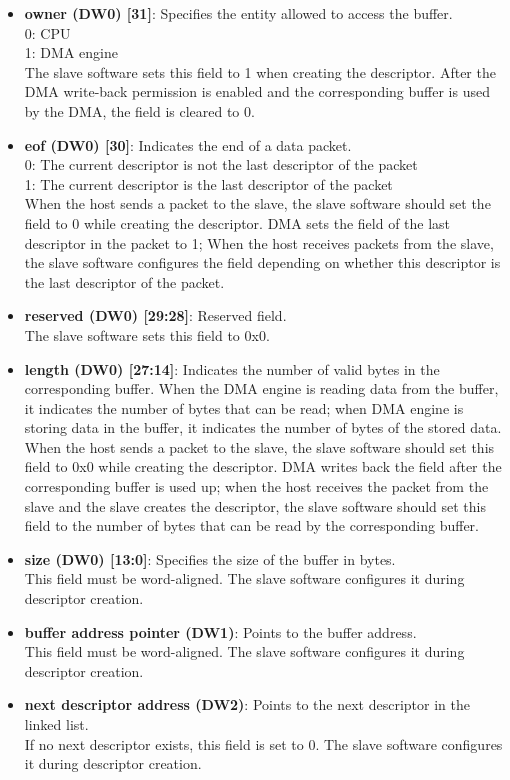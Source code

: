 \documentclass[main\_\_EN.tex]{subfiles}
\begin{document}
\begin{itemize}
     \item \textbf{owner (DW0) [31]}: Specifies the entity allowed to access the buffer. \\
     0: CPU\\
     1: DMA engine\\
     The slave software sets this field to 1 when creating the descriptor. After the DMA write-back permission is enabled and the corresponding buffer is used by the DMA, the field is cleared to 0.
     \item \textbf{eof (DW0) [30]}: Indicates the end of a data packet. \\
     0: The current descriptor is not the last descriptor of the packet\\
     1: The current descriptor is the last descriptor of the packet\\
     When the host sends a packet to the slave, the slave software should set the field to 0 while creating the descriptor. DMA sets the field of the last descriptor in the packet to 1; When the host receives packets from the slave, the slave software configures the field depending on whether this descriptor is the last descriptor of the packet.
     \item \textbf{reserved (DW0) [29:28]}: Reserved field. \\
    The slave software sets this field to 0x0.
     \item \textbf{length (DW0) [27:14]}: Indicates the number of valid bytes in the corresponding buffer. When the DMA engine is reading data from the buffer, it indicates the number of bytes that can be read; when DMA engine is storing data in the buffer, it indicates the number of bytes of the stored data. \\
     When the host sends a packet to the slave, the slave software should set this field to 0x0 while creating the descriptor. DMA writes back the field after the corresponding buffer is used up; when the host receives the packet from the slave and the slave creates the descriptor, the slave software should set this field to the number of bytes that can be read by the corresponding buffer.
     \item \textbf{size (DW0) [13:0]}: Specifies the size of the buffer in bytes. \\
    This field must be word-aligned. The slave software configures it during descriptor creation.
     \item \textbf{buffer address pointer (DW1)}: Points to the buffer address. \\
    This field must be word-aligned. The slave software configures it during descriptor creation.
     \item \textbf{next descriptor address (DW2)}: Points to the next descriptor in the linked list. \\
    If no next descriptor exists, this field is set to 0. The slave software configures it during descriptor creation.
\end{itemize}
\end{document}
